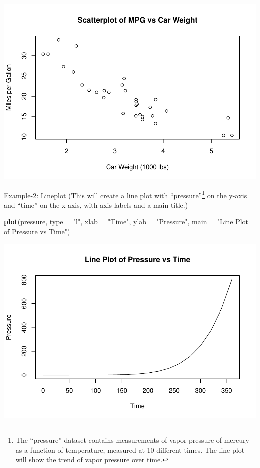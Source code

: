 \documentclass[
]{book}
\newenvironment{Shaded}{\begin{snugshade}}{\end{snugshade}}
\newcommand{\AttributeTok}[1]{\textcolor[rgb]{0.13,0.29,0.53}{#1}}
\newcommand{\FunctionTok}[1]{\textcolor[rgb]{0.13,0.29,0.53}{\textbf{#1}}}
\newcommand{\NormalTok}[1]{#1}
\newcommand{\StringTok}[1]{\textcolor[rgb]{0.31,0.60,0.02}{#1}}
\begin{document}
\begin{center}\includegraphics[height=0.55\textheight]{DauR_files/figure-latex/p1-1} \end{center}

Example-2: Lineplot (This will create a line plot with ``pressure''\footnote{The ``pressure'' dataset contains measurements of vapor pressure of mercury as a function of temperature, measured at 10 different times. The line plot will show the trend of vapor pressure over time.} on the y-axis and ``time'' on the x-axis, with axis labels and a main title.)

\begin{Shaded}
\begin{Highlighting}[]
\FunctionTok{plot}\NormalTok{(pressure, }
     \AttributeTok{type =} \StringTok{"l"}\NormalTok{, }
     \AttributeTok{xlab =} \StringTok{"Time"}\NormalTok{, }
     \AttributeTok{ylab =} \StringTok{"Pressure"}\NormalTok{, }
     \AttributeTok{main =} \StringTok{"Line Plot of Pressure vs Time"}\NormalTok{)}
\end{Highlighting}
\end{Shaded}

\begin{center}\includegraphics[height=0.55\textheight]{DauR_files/figure-latex/p2-1} \end{center}
\end{document}
